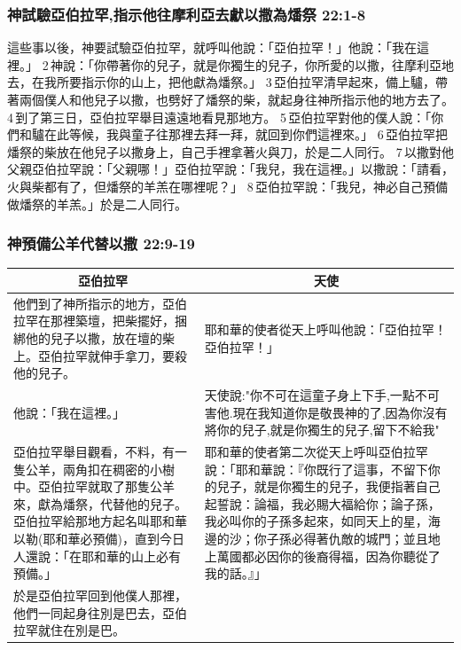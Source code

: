 \subsubsection{神試驗亞伯拉罕,指示他往摩利亞去獻以撒為燔祭 22:1-8}
\noindent 
這些事以後，神要試驗亞伯拉罕，就呼叫他說：「亞伯拉罕！」他說：「我在這裡。」 2 神說：「你帶著你的兒子，就是你獨生的兒子，你所愛的以撒，往摩利亞地去，在我所要指示你的山上，把他獻為燔祭。」 3 亞伯拉罕清早起來，備上驢，帶著兩個僕人和他兒子以撒，也劈好了燔祭的柴，就起身往神所指示他的地方去了。 4 到了第三日，亞伯拉罕舉目遠遠地看見那地方。 5 亞伯拉罕對他的僕人說：「你們和驢在此等候，我與童子往那裡去拜一拜，就回到你們這裡來。」 6 亞伯拉罕把燔祭的柴放在他兒子以撒身上，自己手裡拿著火與刀，於是二人同行。 7 以撒對他父親亞伯拉罕說：「父親哪！」亞伯拉罕說：「我兒，我在這裡。」以撒說：「請看，火與柴都有了，但燔祭的羊羔在哪裡呢？」 8 亞伯拉罕說：「我兒，神必自己預備做燔祭的羊羔。」於是二人同行。

\subsubsection{神預備公羊代替以撒 22:9-19} 
\begin{table}[H]
\centering
\begin{tabular}{p{}|p{10.5cm}}\hline\hline
\multicolumn{1}{c|}{亞伯拉罕}&\multicolumn{1}{c}{天使}\\\hline
他們到了神所指示的地方，亞伯拉罕在那裡築壇，把柴擺好，捆綁他的兒子以撒，放在壇的柴上。亞伯拉罕就伸手拿刀，要殺他的兒子。
&耶和華的使者從天上呼叫他說：「亞伯拉罕！亞伯拉罕！」\\\hline
他說：「我在這裡。」
&天使說:"你不可在這童子身上下手,一點不可害他.現在我知道你是敬畏神的了,因為你沒有將你的兒子,就是你獨生的兒子,留下不給我"\\\hline
亞伯拉罕舉目觀看，不料，有一隻公羊，兩角扣在稠密的小樹中。亞伯拉罕就取了那隻公羊來，獻為燔祭，代替他的兒子。亞伯拉罕給那地方起名叫耶和華以勒(耶和華必預備)，直到今日人還說：「在耶和華的山上必有預備。」
&耶和華的使者第二次從天上呼叫亞伯拉罕說：「耶和華說：『你既行了這事，不留下你的兒子，就是你獨生的兒子，我便指著自己起誓說：論福，我必賜大福給你；論子孫，我必叫你的子孫多起來，如同天上的星，海邊的沙；你子孫必得著仇敵的城門；並且地上萬國都必因你的後裔得福，因為你聽從了我的話。』」\\\hline
於是亞伯拉罕回到他僕人那裡，他們一同起身往別是巴去，亞伯拉罕就住在別是巴。&\\\hline
\end{tabular}
\end{table}


